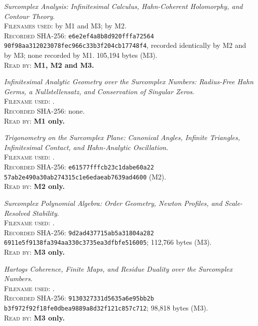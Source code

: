 \documentclass[11pt,letterpaper]{article}
\numberwithin{equation}{section}
\theoremstyle{definition}
\theoremstyle{remark}
\begin{document}
{\small
\begin{description}[leftmargin=2.2em,style=sameline,itemsep=0.7em]

\item[\textbf{A}] \emph{Surcomplex Analysis: Infinitesimal Calculus,
Hahn-Coherent Holomorphy, and Contour Theory}.\\
\textsc{Filenames used:}  by M1 and M3;
 by M2.\\
\textsc{Recorded SHA-256:} \texttt{e6e2ef4a8b8d920fffa72564}
\texttt{90f98aa312023078fec966c33b3f204cb17748f4}, recorded identically by M2
and by M3; none recorded by M1. 105{,}194 bytes (M3).\\
\textsc{Read by:} \textbf{M1, M2 and M3.}

\item[\textbf{AG}] \emph{Infinitesimal Analytic Geometry over the Surcomplex
Numbers: Radius-Free Hahn Germs, a Nullstellensatz, and Conservation of
Singular Zeros}.\\
\textsc{Filename used:} .\\
\textsc{Recorded SHA-256:} none.\\
\textsc{Read by:} \textbf{M1 only.}

\item[\textbf{T}] \emph{Trigonometry on the Surcomplex Plane: Canonical Angles,
Infinite Triangles, Infinitesimal Contact, and Hahn-Analytic Oscillation}.\\
\textsc{Filename used:} .\\
\textsc{Recorded SHA-256:} \texttt{e61577fffcb23c1dabe60a22}
\texttt{57ab2e490a30ab274315c1e6edaeab7639ad4600} (M2).\\
\textsc{Read by:} \textbf{M2 only.}

\item[\textbf{P}] \emph{Surcomplex Polynomial Algebra: Order Geometry, Newton
Profiles, and Scale-Resolved Stability}.\\
\textsc{Filename used:} .\\
\textsc{Recorded SHA-256:} \texttt{9d2ad437715ab5a31804a282}
\texttt{6911e5f9138fa394aa330c3735ea3dfbfe516005}; 112{,}766 bytes (M3).\\
\textsc{Read by:} \textbf{M3 only.}

\item[\textbf{R}] \emph{Hartogs Coherence, Finite Maps, and Residue Duality
over the Surcomplex Numbers}.\\
\textsc{Filename used:} .\\
\textsc{Recorded SHA-256:} \texttt{9130327331d5635a6e95bb2b}
\texttt{b3f972f92f18fe0dbea9889a8d32f121c857c712}; 98{,}818 bytes (M3).\\
\textsc{Read by:} \textbf{M3 only.}

\end{description}
}
\end{document}
